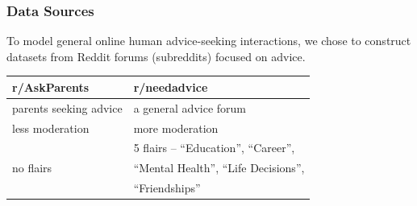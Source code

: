 \begin{frame}[c]\frametitle{Data Sources}

To model general online human advice-seeking interactions, we chose to construct datasets from Reddit forums (subreddits) focused on advice.

\pause

\vspace{10mm}

\begin{table}[H]
    \centering
    \begin{tabular}{ll}
        \toprule
        \textbf{r/AskParents} & \textbf{r/needadvice} \\ \midrule
        parents seeking advice & a general advice forum \\ \midrule
        less moderation & more moderation\\ \midrule
        \multirow{3}{*}{no flairs} & 5 flairs -- ``Education'', ``Career'',\\
        & ``Mental Health'', ``Life Decisions'', \\
        & ``Friendships''\\ \bottomrule
    \end{tabular}
    \label{tab:datasources}
\end{table}

\end{frame}



